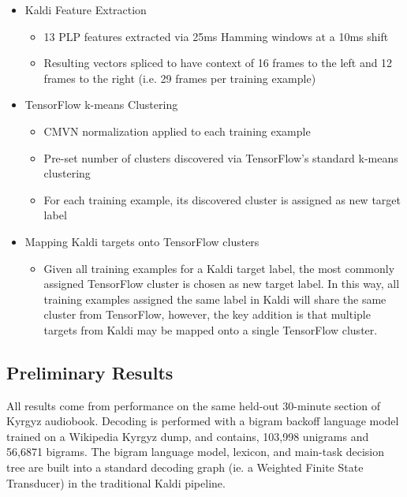 \documentclass[a4paper]{article}
\begin{document}
\begin{itemize}
\item Kaldi Feature Extraction
  \begin{itemize}
  \item 13 PLP features extracted via 25ms Hamming windows at a 10ms shift
  \item Resulting vectors spliced to have context of 16 frames to the left and 12 frames to the right (i.e. 29 frames per training example)
  \end{itemize}

\item TensorFlow k-means Clustering
  \begin{itemize}
  \item CMVN normalization applied to each training example
  \item Pre-set number of clusters discovered via TensorFlow's standard k-means clustering
  \item For each training example, its discovered cluster is assigned as new target label
  \end{itemize}

\item Mapping Kaldi targets onto TensorFlow clusters
   \begin{itemize}
   \item Given all training examples for a Kaldi target label, the most commonly assigned TensorFlow cluster is chosen as new target label. In this way, all training examples assigned the same label in Kaldi will share the same cluster from TensorFlow, however, the key addition is that multiple targets from Kaldi may be mapped onto a single TensorFlow cluster.
  \end{itemize} 
\end{itemize}






\subsection{Preliminary Results}


All results come from performance on the same held-out 30-minute section of Kyrgyz audiobook. Decoding is performed with a bigram backoff language model trained on a Wikipedia Kyrgyz dump, and contains, 103,998 unigrams and 56,6871 bigrams. The bigram language model, lexicon, and main-task decision tree are built into a standard decoding graph (ie. a Weighted Finite State Transducer) in the traditional Kaldi pipeline. 
\end{document}
